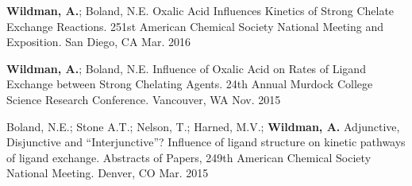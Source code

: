 


\begin{cvpresentations}


\cvpresentation
{\textbf{Wildman, A.}; Boland, N.E. Oxalic Acid Influences Kinetics of Strong Chelate Exchange Reactions. 251st American Chemical Society National Meeting and Exposition.} %
{San Diego, CA} %
{Mar. 2016} %


\cvpresentation
{\textbf{Wildman, A.}; Boland, N.E. Influence of Oxalic Acid on Rates of Ligand Exchange between Strong Chelating Agents. 24th Annual Murdock College Science Research Conference.} %
{Vancouver, WA} %
{Nov. 2015} %


\cvpresentation
{Boland, N.E.; Stone A.T.; Nelson, T.; Harned, M.V.; \textbf{Wildman, A.} Adjunctive, Disjunctive and “Interjunctive”? Influence of ligand structure on kinetic pathways of ligand exchange. Abstracts of Papers, 249th American Chemical Society National Meeting.} %
{Denver, CO} %
{Mar. 2015} %


\end{cvpresentations}
\vspace{-1cm}
